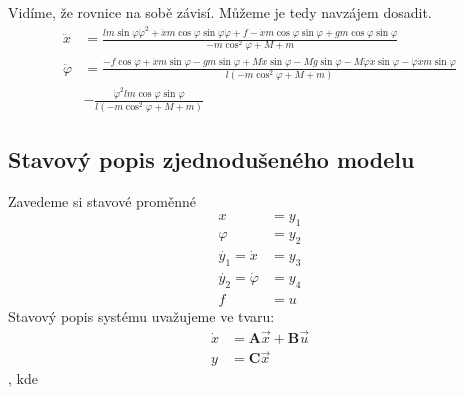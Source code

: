 \documentclass[a4paper, 12pt]{article}
\begin{document}
			Vidíme, že rovnice na sobě závisí. Můžeme je tedy navzájem dosadit.
			\begin{align*}
				\ddot{x} &= \frac{lm\sin\varphi\dot{\varphi}^2+\dot{x}m\cos\varphi\sin\varphi\dot{\varphi}+f-\dot{x}m\cos\varphi\sin\varphi+gm\cos\varphi\sin\varphi}{-m\cos^2\varphi+M+m}\\
				\ddot{\varphi} &= \frac{-f\cos\varphi+\dot{x}m\sin\varphi-gm\sin\varphi+M\dot{x}\sin\varphi-Mg\sin\varphi-M\dot{\varphi}\dot{x}\sin\varphi-\dot{\varphi}\dot{x}m\sin\varphi}{l\left(-m\cos^2\varphi+M+m\right)}\\
				&- \frac{\dot{\varphi}^2lm\cos\varphi\sin\varphi}{l\left(-m\cos^2\varphi+M+m\right)}
			\end{align*}
		\subsection{Stavový popis zjednodušeného modelu}
			Zavedeme si stavové proměnné
			\begin{align*}
				x &= y_1\\
				\varphi &= y_2\\
				\dot{y_1} = \dot{x} &= y_3\\
				\dot{y_2} = \dot{\varphi} &= y_4\\
				f &= u
			\end{align*}
			Stavový popis systému uvažujeme ve tvaru:
			\begin{align*}
				\dot{x} &= \mathbf{A}\vec{x}+\mathbf{B}\vec{u}\\
				y &= \mathbf{C}\vec{x}   %
			\end{align*}
			, kde 
\end{document}
